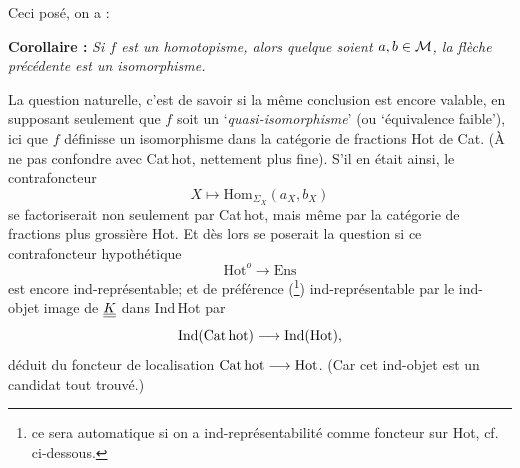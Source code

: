 Ceci posé, on a :

\textbf{Corollaire :} \textit{Si $f$ est un homotopisme, alors quelque soient $a,b\in\mathcal{M}$, la flèche précédente est un isomorphisme.} %

La question naturelle, c'est de savoir si la même conclusion est encore valable, en supposant seulement que $f$ soit un ‘\textit{quasi-isomorphisme}’ (ou ‘équivalence faible’), ici que $f$ définisse un isomorphisme dans la catégorie de fractions Hot de Cat. (À ne pas confondre avec Cat\,hot,
nettement plus fine). S'il en était ainsi, le contrafoncteur
\[
X\longmapsto\mathrm{Hom}_{\Sigma_X}(a_X,b_X)
\]
se factoriserait non seulement par Cat\,hot, mais même par la catégorie de fractions plus grossière Hot. Et dès lors se poserait la question si ce contrafoncteur hypothétique
\[
\mathrm{Hot}^{o}\longrightarrow\mathrm{Ens}
\]
est encore ind-représentable; et de préférence (\footnote[5]{ce sera automatique si on a ind-représentabilité comme foncteur sur Hot, cf. ci-dessous.}) ind-représentable par le ind-objet image de $\underline{\underline{K}}$ dans Ind\,Hot par
\[
\mathrm{Ind}(\mathrm{Cat\,hot})\longrightarrow\mathrm{Ind}(\mathrm{Hot}),
\]
déduit du foncteur de localisation $\mathrm{Cat\,hot}\longrightarrow\mathrm{Hot}$. (Car cet ind-objet est un candidat tout trouvé.)

